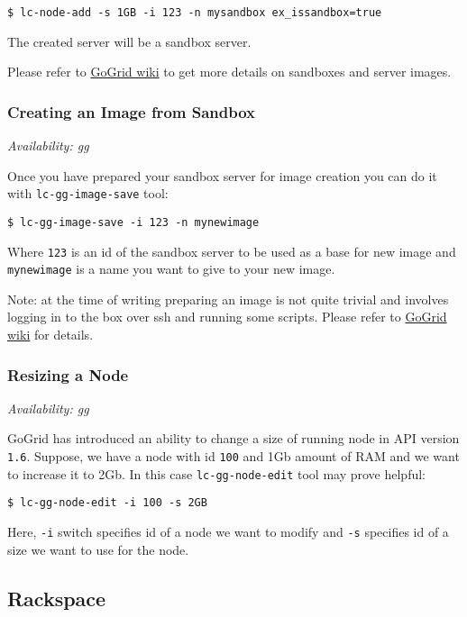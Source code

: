 \documentclass[a4paper]{report}
\begin{document}
\begin{verbatim}
$ lc-node-add -s 1GB -i 123 -n mysandbox ex_issandbox=true
\end{verbatim}


The created server will be a sandbox server.


Please refer to \href{http://wiki.gogrid.com/wiki/index.php/MyGSI}{GoGrid wiki} to get
more details on sandboxes and server images.

\subsubsection{Creating an Image from Sandbox}

\textit{Availability: gg}

Once you have prepared your sandbox server for image creation you can do it with
\texttt{lc-gg-image-save} tool:

\begin{verbatim}
$ lc-gg-image-save -i 123 -n mynewimage
\end{verbatim}

Where \texttt{123} is an id of the sandbox server to be used as a base for new image and
\texttt{mynewimage} is a name you want to give to your new image.

Note: at the time of writing preparing an image is not quite trivial and involves logging in
to the box over ssh and running some scripts. Please refer to 
\href{http://wiki.gogrid.com/wiki/index.php/MyGSI}{GoGrid wiki} for details.

\subsubsection{Resizing a Node}

\textit{Availability: gg}

GoGrid has introduced an ability to change a size of running node in API version \texttt{1.6}.
Suppose, we have a node with id \texttt{100} and 1Gb amount of RAM and we want to increase it
to 2Gb. In this case \texttt{lc-gg-node-edit} tool may prove helpful:

\begin{verbatim}
$ lc-gg-node-edit -i 100 -s 2GB
\end{verbatim}

Here, \texttt{-i} switch specifies id of a node we want to modify and \texttt{-s} specifies
id of a size we want to use for the node.

\subsection{Rackspace}
\end{document}
